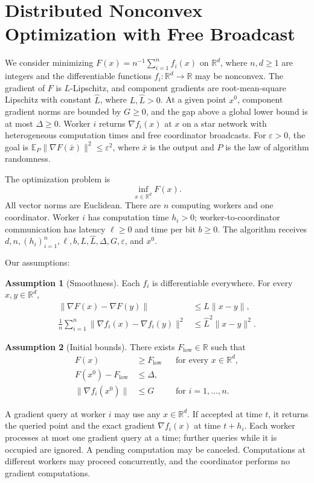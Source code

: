 \documentclass[10pt]{article}
\theoremstyle{definition}
\newtheorem{assumption}{Assumption}
\begin{document}
\section*{Distributed Nonconvex Optimization with Free Broadcast}
We consider minimizing $F(x)=n^{-1}\sum_{i=1}^n f_i(x)$ on $\mathbb{R}^d$, where $n,d\geq1$ are integers and the differentiable functions $f_i:\mathbb{R}^d\to\mathbb{R}$ may be nonconvex. The gradient of $F$ is $L$-Lipschitz, and component gradients are root-mean-square Lipschitz with constant $\widehat L$, where $L,\widehat L>0$. At a given point $x^0$, component gradient norms are bounded by $G\geq0$, and the gap above a global lower bound is at most $\Delta\geq0$. Worker $i$ returns $\nabla f_i(x)$ at $x$ on a star network with heterogeneous computation times and free coordinator broadcasts. For $\varepsilon>0$, the goal is $\mathbb{E}_{P}\|\nabla F(\bar{x})\|^2\leq\varepsilon^2$, where $\bar{x}$ is the output and $P$ is the law of algorithm randomness.

The optimization problem is
\[
\inf_{x\in\mathbb{R}^d} F(x).
\]
All vector norms are Euclidean. There are $n$ computing workers and one coordinator. Worker $i$ has computation time $h_i>0$; worker-to-coordinator communication has latency $\ell\geq0$ and time per bit $b\geq0$. The algorithm receives $d,n,(h_i)_{i=1}^n,\ell,b,L,\widehat L,\Delta,G,\varepsilon$, and $x^0$.

Our assumptions:
\begin{assumption}[Smoothness]
Each $f_i$ is differentiable everywhere. For every $x,y\in\mathbb{R}^d$,
\[
\begin{aligned}
\|\nabla F(x)-\nabla F(y)\|
&\leq L\|x-y\|,\\
\frac{1}{n}\sum_{i=1}^n
\|\nabla f_i(x)-\nabla f_i(y)\|^2
&\leq \widehat L^2\|x-y\|^2.
\end{aligned}
\]
\end{assumption}

\begin{assumption}[Initial bounds]
There exists $F_{\mathrm{low}}\in\mathbb{R}$ such that
\[
\begin{aligned}
F(x)&\geq F_{\mathrm{low}}
&&\text{for every }x\in\mathbb{R}^d,\\
F(x^0)-F_{\mathrm{low}}&\leq\Delta,\\
\|\nabla f_i(x^0)\|&\leq G
&&\text{for }i=1,\ldots,n.
\end{aligned}
\]
\end{assumption}

A gradient query at worker $i$ may use any $x\in\mathbb{R}^d$. If accepted at time $t$, it returns the queried point and the exact gradient $\nabla f_i(x)$ at time $t+h_i$. Each worker processes at most one gradient query at a time; further queries while it is occupied are ignored. A pending computation may be canceled. Computations at different workers may proceed concurrently, and the coordinator performs no gradient computations.
\end{document}

